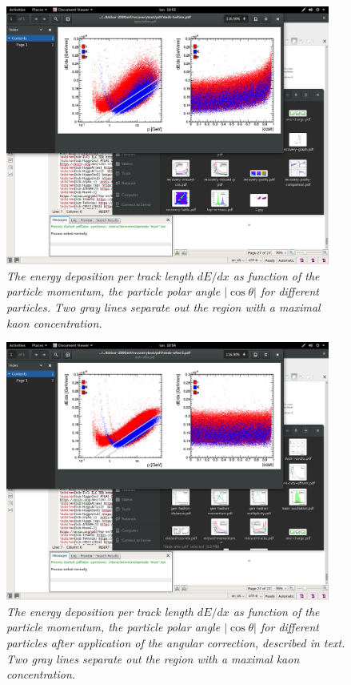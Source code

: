 \begin{figure}
	{\centering
		\includegraphics[clip, trim=8cm 18.5cm 7cm 4cm,width=0.95\textwidth]{ILD/plots/dedx-before.png}
		\caption{\sl The energy deposition per track length $dE/dx$ as function of the particle momentum, the particle polar angle $|\cos\theta|$ for different particles. Two gray lines separate out the region with a maximal kaon concentration. 
		}
		\label{fig:dEdxBefore_3F}
	}
\end{figure}

\begin{figure}
	{\centering
		\includegraphics[clip, trim=8cm 18.5cm 7cm 4cm, width=0.95\textwidth]{ILD/plots/dedx-after.png}
		\caption{\sl The energy deposition per track length $dE/dx$ as function of the particle momentum, the particle polar angle $|\cos\theta|$ for different particles after application of the angular correction, described in text. Two gray lines separate out the region with a maximal kaon concentration. 
		}
		\label{fig:dEdxAfter_3F}
	}
\end{figure}


